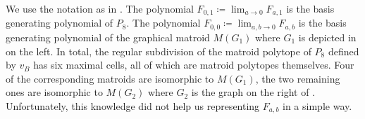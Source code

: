 \documentclass[11pt]{article}
\theoremstyle{definition}
\numberwithin{equation}{section}
\begin{document}
\begin{rem}\label{rem:subd}
    We use the notation as in .
    The polynomial $F_{0,1}\coloneqq \lim_{a\to0}F_{a,1}$ is the basis generating polynomial of $P_8$. The polynomial $F_{0,0}\coloneqq \lim_{a,b\to0}F_{a,b}$ is the basis generating polynomial of the graphical matroid $M(G_1)$ where $G_1$ is depicted in  on the left. In total, the regular subdivision of the matroid polytope of $P_8$ defined by $v_B$ has six maximal cells, all of which are matroid polytopes themselves. Four of the corresponding matroids are isomorphic to $M(G_1)$, the two remaining ones are isomorphic to $M(G_2)$ where $G_2$ is the graph on the right of .
    Unfortunately, this knowledge did not help us representing $F_{a,b}$ in a simple way.
\end{rem}
\end{document}
